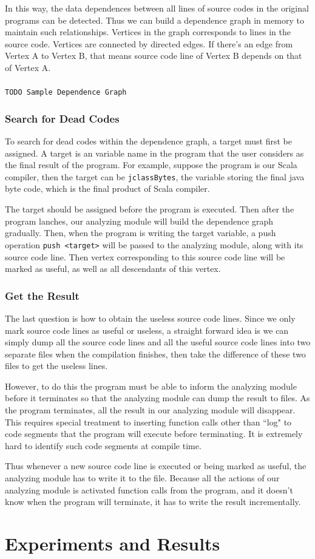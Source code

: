 \documentclass{article}[12pt]
\begin{document}
In this way, the data dependences between all lines of source codes in the original programs can be detected. Thus we can build a dependence graph in memory to maintain such relationships. Vertices in the graph corresponds to lines in the source code. Vertices are connected by directed edges. If there's an edge from Vertex A to Vertex B, that means source code line of Vertex B depends on that of Vertex A. 
\\
\\
\texttt{TODO Sample Dependence Graph}
\subsubsection{Search for Dead Codes}
To search for dead codes within the dependence graph, a target must first be assigned. A target is an variable name in the program that the user considers as the final result of the program. For example, suppose the program is our Scala compiler, then the target can be \texttt{jclassBytes}, the variable storing the final java byte code, which is the final product of Scala compiler. 

The target should be assigned before the program is executed. Then after the program lanches, our analyzing module will build the dependence graph gradually. Then, when the program is writing the target variable, a push operation \texttt{push <target>} will be passed to the analyzing module, along with its source code line. Then vertex corresponding to this source code line will be marked as useful, as well as all descendants of this vertex. 
\subsubsection{Get the Result}
The last question is how to obtain the useless source code lines. Since we only mark source code lines as useful or useless, a straight forward idea is we can simply dump all the source code lines and all  the useful source code lines into two separate files when the compilation finishes, then take the difference of these two files to get the useless lines. 

However, to do this the program must be able to inform the analyzing module before it terminates so that the analyzing module can dump the result to files. As the program terminates, all the result in our analyzing module will disappear. This requires special treatment to inserting function calls other than ``log" to code segments that the program will execute before terminating. It is extremely hard to identify such code segments at compile time. 

Thus whenever a new source code line is executed or being marked as useful, the analyzing module has to write it to the file. Because all the actions of our analyzing module is activated function calls from the program, and it doesn't know when the program will terminate, it has to write the result incrementally. 

\section{Experiments and Results} 
\end{document}
